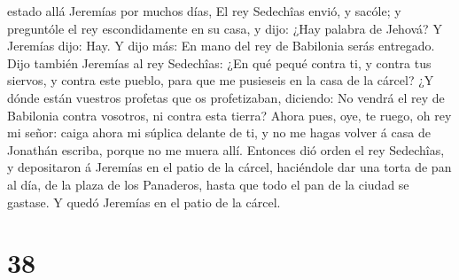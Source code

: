 estado allá Jeremías por muchos días,  El rey Sedechîas
envió, y sacóle; y preguntóle el rey escondidamente en su casa, y dijo:
¿Hay palabra de Jehová? Y Jeremías dijo: Hay. Y dijo más: En mano del
rey de Babilonia serás entregado.  Dijo también Jeremías al
rey Sedechîas: ¿En qué pequé contra ti, y contra tus siervos, y contra
este pueblo, para que me pusieseis en la casa de la cárcel?
 ¿Y dónde están vuestros profetas que os profetizaban,
diciendo: No vendrá el rey de Babilonia contra vosotros, ni contra esta
tierra?  Ahora pues, oye, te ruego, oh rey mi señor: caiga
ahora mi súplica delante de ti, y no me hagas volver á casa de Jonathán
escriba, porque no me muera allí.  Entonces dió orden el
rey Sedechîas, y depositaron á Jeremías en el patio de la cárcel,
haciéndole dar una torta de pan al día, de la plaza de los Panaderos,
hasta que todo el pan de la ciudad se gastase. Y quedó Jeremías en el
patio de la cárcel.

\hypertarget{section-37}{%
\section{38}\label{section-37}}

